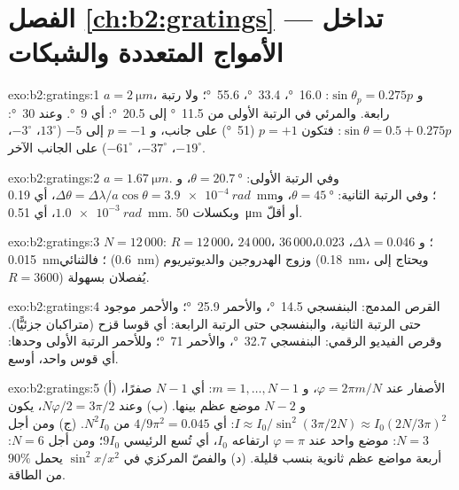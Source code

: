 \section*{الفصل \ref{ch:b2:gratings} --- تداخل الأمواج المتعددة والشبكات}

\begin{solution}{exo:b2:gratings:1}
$a = \qty{2}{\micro m}$، و $\sin\theta_p = 0.275p$: \qty{16.0}{\degree}، \qty{33.4}{\degree}، \qty{55.6}{\degree}؛
ولا رتبة رابعة. والمرئي في الرتبة الأولى من \qty{11.5}{\degree} إلى \qty{20.5}{\degree}:
أي \qty{9}{\degree}. وعند \qty{30}{\degree}: $\sin\theta = 0.5 + 0.275p$: فتكون $p = +1$ (\qty{51}{\degree}) على جانب،
و $p = -1$ إلى $-5$ ($13^\circ$، $-3^\circ$، $-19^\circ$، $-37^\circ$، $-61^\circ$) على
الجانب الآخر.
\end{solution}

\begin{solution}{exo:b2:gratings:2}
$a = \qty{1.67}{\micro m}$. وفي الرتبة الأولى: $\theta = \qty{20.7}{\degree}$، و $\Delta\theta = \Delta\lambda/a\cos\theta =
\qty{3.9e-4}{rad}$، أي \qty{0.19}{mm}؛ وفي الرتبة الثانية: $\theta = \qty{45}{\degree}$، و $\qty{1.0e-3}{rad}$،
أي \qty{0.51}{mm}. وبكسلات \qty{50}{\micro m} أو أقلّ.
\end{solution}

\begin{solution}{exo:b2:gratings:3}
$N = 12\,000$: $R = 12\,000$، $24\,000$، $36\,000$؛ و $\Delta\lambda = 0.046$، $0.023$، \qty{0.015}{nm}؛
فالثنائي (\qty{0.6}{nm}) وزوج الهدروجين والديوتيريوم (\qty{0.18}{nm}، ويحتاج إلى $R = 3600$)
يُفصلان بسهولة.
\end{solution}

\begin{solution}{exo:b2:gratings:4}
القرص المدمج: البنفسجي \qty{14.5}{\degree}، والأحمر \qty{25.9}{\degree}؛ والأحمر موجود حتى الرتبة الثانية، والبنفسجي حتى
الرتبة الرابعة: أي قوسا قزح (متراكبان جزئيًّا). وقرص الفيديو الرقمي: البنفسجي \qty{32.7}{\degree}، والأحمر
\qty{71}{\degree}؛ وللأحمر الرتبة الأولى وحدها: أي قوس واحد، أوسع.
\end{solution}

\begin{solution}{exo:b2:gratings:5}
(أ) الأصفار عند $\varphi = 2\pi m/N$، و $m = 1, \dots, N - 1$: أي $N - 1$ صفرًا، و $N - 2$ موضع عظم
بينها. (ب) وعند $N\varphi/2 = 3\pi/2$، يكون $I \approx I_0/\sin^2(3\pi/2N) \approx I_0(2N/3\pi)^2$:
أي $4/9\pi^2 = 0.045$ من $N^2I_0$. (ج) ومن أجل $N = 3$: موضع  واحد عند
$\varphi = \pi$ ارتفاعه $I_0$، أي تُسع الرئيسي $9I_0$؛ ومن أجل $N = 6$: أربعة
مواضع عظم ثانوية بنسب قليلة. (د) والفصّ المركزي في $\sin^2x/x^2$
يحمل $90\%$ من الطاقة.
\end{solution}


